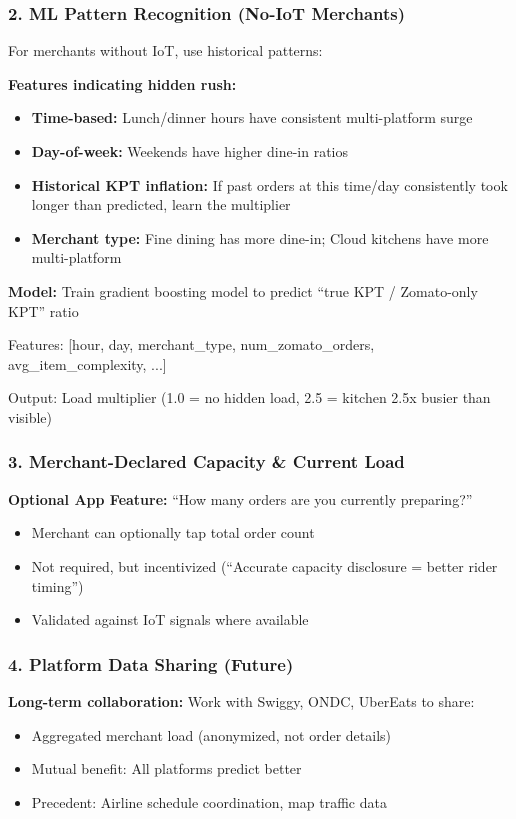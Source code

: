 \documentclass[11pt,a4paper]{article}
\begin{document}
\subsubsection{2. ML Pattern Recognition (No-IoT Merchants)}

For merchants without IoT, use historical patterns:

\textbf{Features indicating hidden rush:}
\begin{itemize}[leftmargin=*]
    \item \textbf{Time-based:} Lunch/dinner hours have consistent multi-platform surge
    \item \textbf{Day-of-week:} Weekends have higher dine-in ratios
    \item \textbf{Historical KPT inflation:} If past orders at this time/day consistently took longer than predicted, learn the multiplier
    \item \textbf{Merchant type:} Fine dining has more dine-in; Cloud kitchens have more multi-platform
\end{itemize}

\textbf{Model:}
Train gradient boosting model to predict ``true KPT / Zomato-only KPT'' ratio

Features: [hour, day, merchant\_type, num\_zomato\_orders, avg\_item\_complexity, ...]

Output: Load multiplier (1.0 = no hidden load, 2.5 = kitchen 2.5x busier than visible)

\subsubsection{3. Merchant-Declared Capacity \& Current Load}

\textbf{Optional App Feature:} ``How many orders are you currently preparing?''
\begin{itemize}
    \item Merchant can optionally tap total order count
    \item Not required, but incentivized (``Accurate capacity disclosure = better rider timing'')
    \item Validated against IoT signals where available
\end{itemize}

\subsubsection{4. Platform Data Sharing (Future)}

\textbf{Long-term collaboration:} Work with Swiggy, ONDC, UberEats to share:
\begin{itemize}
    \item Aggregated merchant load (anonymized, not order details)
    \item Mutual benefit: All platforms predict better
    \item Precedent: Airline schedule coordination, map traffic data
\end{itemize}
\end{document}
